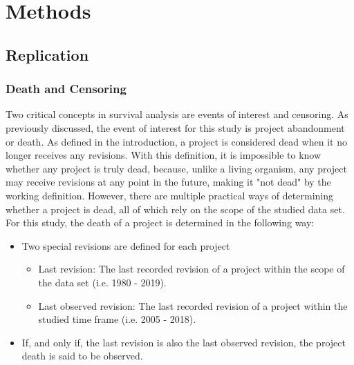 \documentclass[acmconf]{acmart}
\begin{document}

\section{Methods} \label{methods}

\subsection{Replication} \label{replmethods}
\subsubsection{Death and Censoring} \label{death_censoring}

Two critical concepts in survival analysis are events of interest and censoring.
As previously discussed, the event of interest for this study is project abandonment or death.
As defined in the introduction, a project is considered dead when it no longer receives any revisions.
With this definition, it is impossible to know whether any project is truly dead, because, unlike a living organism, any project may receive revisions at any point in the future, making it "not dead" by the working definition.
However, there are multiple practical ways of determining whether a project is dead, all of which rely on the scope of the studied data set.
For this study, the death of a project is determined in the following way:

\begin{itemize}
    \item Two special revisions are defined for each project
    \begin{itemize}
        \item Last revision: The last recorded revision of a project within the scope of the data set (i.e. 1980 - 2019).
        \item Last observed revision: The last recorded revision of a project within the studied time frame (i.e. 2005 - 2018).
    \end{itemize}
    \item If, and only if, the last revision is also the last observed revision, the project death is said to be observed.
\end{itemize}
\end{document}
